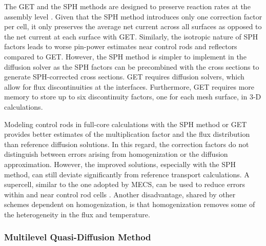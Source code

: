 The \gls{GET} and the \gls{SPH} methods are designed to preserve reaction rates at the assembly
level \cite{yamamoto_cell_2004}. Given that the \gls{SPH} method introduces only one correction
factor per cell, it only preserves the average net current across all surfaces as opposed
to the net current at each surface with \gls{GET}. Similarly, the isotropic nature of \gls{SPH}
factors leads to worse pin-power estimates near control rods and reflectors compared to \gls{GET}.
However, the \gls{SPH} method is simpler to implement in the diffusion solver as the \gls{SPH}
factors can be precombined with the cross sections to generate \gls{SPH}-corrected cross sections.
\gls{GET} requires diffusion solvers, which allow for flux discontinuities at the interfaces.
Furthermore, \gls{GET} requires more memory to store up to six discontinuity factors, one for each
mesh surface, in 3-D calculations.

Modeling control rods in full-core calculations with the \gls{SPH} method or \gls{GET} provides
better estimates of the multiplication factor and the flux distribution than reference diffusion
solutions. In this regard, the correction factors do not distinguish between errors arising from
homogenization or the diffusion approximation. However, the improved solutions, especially with the
\gls{SPH} method, can still deviate significantly from reference transport calculations. A
supercell, similar to the one adopted by \gls{MECS}, can be used to reduce errors within and near
control rod cells \cite{ortensi_newton_2018}. Another disadvantage, shared by other schemes
dependent on homogenization, is that homogenization removes some of the heterogeneity in the flux
and temperature.

\subsubsection{Multilevel Quasi-Diffusion Method}

